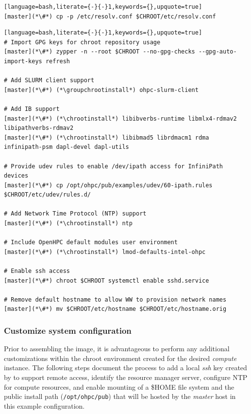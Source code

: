 \documentclass[letterpaper]{article}
\newcommand{\chrootinstall}{zypper -n --root \$CHROOT install}
\newcommand{\groupchrootinstall}{zypper -n --root \$CHROOT install -t pattern}
\begin{document}
\begin{lstlisting}[language=bash,literate={-}{-}1,keywords={},upquote=true]
[master](*\#*) cp -p /etc/resolv.conf $CHROOT/etc/resolv.conf
\end{lstlisting}

\begin{lstlisting}[language=bash,literate={-}{-}1,keywords={},upquote=true]
# Import GPG keys for chroot repository usage
[master](*\#*) zypper -n --root $CHROOT --no-gpg-checks --gpg-auto-import-keys refresh

# Add SLURM client support
[master](*\#*) (*\groupchrootinstall*) ohpc-slurm-client

# Add IB support
[master](*\#*) (*\chrootinstall*) libibverbs-runtime libmlx4-rdmav2 libipathverbs-rdmav2
[master](*\#*) (*\chrootinstall*) libibmad5 librdmacm1 rdma infinipath-psm dapl-devel dapl-utils

# Provide udev rules to enable /dev/ipath access for InfiniPath devices
[master](*\#*) cp /opt/ohpc/pub/examples/udev/60-ipath.rules $CHROOT/etc/udev/rules.d/

# Add Network Time Protocol (NTP) support
[master](*\#*) (*\chrootinstall*) ntp

# Include OpenHPC default modules user environment
[master](*\#*) (*\chrootinstall*) lmod-defaults-intel-ohpc

# Enable ssh access 
[master](*\#*) chroot $CHROOT systemctl enable sshd.service

# Remove default hostname to allow WW to provision network names
[master](*\#*) mv $CHROOT/etc/hostname $CHROOT/etc/hostname.orig
\end{lstlisting}

\subsubsection{Customize system configuration} \label{sec:master_customization}

Prior to assembling the image, it is advantageous to perform any additional
customizations within the chroot environment created for the desired {\em
  compute} instance. The following steps document the process to add a local
{\em ssh} key created by \Warewulf{} to support remote access, identify the
resource manager server, configure NTP for compute resources, and enable \NFS{}
mounting of a \$HOME file system and the public \OHPC{} install path
(\texttt{/opt/ohpc/pub}) that will be hosted by the {\em master} host in this
example configuration.  
\end{document}

